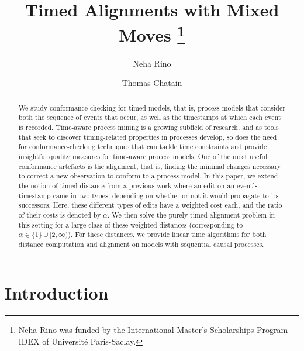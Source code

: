 \documentclass[runningheads]{llncs}
\begin{document}
%
\title{Timed Alignments with Mixed Moves
        \thanks{Neha Rino was funded by the International Master's Scholarships Program IDEX of Université Paris-Saclay.}
}%
%
\author{Neha Rino \and
Thomas Chatain}
%

%
\maketitle              %
%
\begin{abstract}
We study conformance checking for timed models, that is, process models that consider both the sequence of events that occur, as well as the timestamps at which each event is recorded. 
Time-aware process mining is a growing subfield of research, and as tools that seek to discover timing-related properties in processes develop, so does the need for conformance-checking techniques that can tackle time 
constraints and provide insightful quality measures for time-aware process models. 
One of the most useful conformance artefacts is the alignment, that is, finding the minimal changes necessary to correct a new observation to conform to a process model.
In this paper, we extend the notion of timed distance from a previous work where an edit on an event’s timestamp came in two types, depending on whether or not it would propagate to its successors. 
Here, these different types of edits have a weighted cost each, and the ratio of their costs is denoted by $\alpha$. 
We then solve the purely timed alignment problem in this setting for a large class of these weighted distances (corresponding to $\alpha \in \{1\} \cup [2, \infty)$). For these distances, we provide linear time algorithms  for both distance computation and alignment on models with sequential causal processes. 
\end{abstract}
%
%
%
\section{Introduction} 
    
\end{document}
